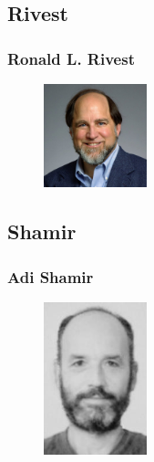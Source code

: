 \documentclass[slidestop,compress,mathserif]{beamer}
\begin{document}
\subsection{\hfill Rivest}
\begin{frame}
  \frametitle{Ronald L. Rivest}
  \begin{multicols}{2}
    \begin{figure}
      \includegraphics[width=3cm]{rivest_photo.jpg}
    \end{figure}
    
  \end{multicols}
  
\end{frame}

\subsection{\hfill Shamir}
\begin{frame}
  \frametitle{Adi Shamir}
  \begin{multicols}{2}
    \begin{figure}
      \includegraphics[width=3cm]{Shamir.jpg}
    \end{figure}
    
  \end{multicols}
  
\end{frame}
\end{document}
